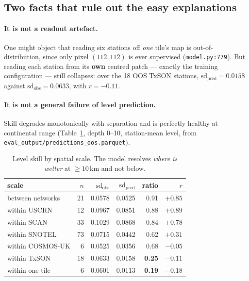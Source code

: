\documentclass[11pt,a4paper]{article}
\begin{document}
\subsection{Two facts that rule out the easy explanations}

\paragraph{It is not a readout artefact.} One might object that reading six stations off
\emph{one} tile's map is out-of-distribution, since only pixel $(112,112)$ is ever
supervised (\verb|model.py:779|). But reading each station from its \textbf{own} centred
patch --- exactly the training configuration --- still collapses: over the 18 OOS TxSON
stations, $\mathrm{sd}_{\text{pred}} = 0.0158$ against
$\mathrm{sd}_{\text{obs}} = 0.0633$, with $r = -0.11$.

\paragraph{It is not a general failure of level prediction.} Skill degrades monotonically
with separation and is perfectly healthy at continental range
(Table~\ref{tab:scale}, depth 0--10, station-mean level, from
\verb|eval_output/predictions_oos.parquet|).

\begin{table}[h]
\centering
\small
\begin{tabular}{lrrrrr}
\toprule
scale & $n$ & $\mathrm{sd}_{\text{obs}}$ & $\mathrm{sd}_{\text{pred}}$ & ratio & $r$ \\
\midrule
between networks   & 21 & 0.0578 & 0.0525 & 0.91 & $+0.85$ \\
within USCRN       & 12 & 0.0967 & 0.0851 & 0.88 & $+0.89$ \\
within SCAN        & 33 & 0.1029 & 0.0868 & 0.84 & $+0.78$ \\
within SNOTEL      & 73 & 0.0715 & 0.0442 & 0.62 & $+0.31$ \\
within COSMOS-UK   &  6 & 0.0525 & 0.0356 & 0.68 & $-0.05$ \\
within TxSON       & 18 & 0.0633 & 0.0158 & \textbf{0.25} & $\mathbf{-0.11}$ \\
within one tile    &  6 & 0.0601 & 0.0113 & \textbf{0.19} & $\mathbf{-0.18}$ \\
\bottomrule
\end{tabular}
\caption{Level skill by spatial scale. The model resolves \emph{where is wetter} at
$\ge 10$\,km and not below.}
\label{tab:scale}
\end{table}
\end{document}
